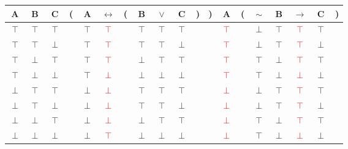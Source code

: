 \documentclass[11pt]{article}
\begin{document}
\vspace{2em}

\begin{tabular}{ c  c  c | c  c  c  c  c  c  c  c  c | c | c  c  c  c  c  c }
A & B & C & ( & A & $\leftrightarrow$ & ( & B & $\lor$ & C & ) & ) & A & ( & $\sim$ & B & $\rightarrow$ & C & )\\
\hline 
$\top$ & $\top$ & $\top$ &  & $\top$ & \textcolor{red}{$\top$} &  & $\top$ & $\top$ & $\top$ &  &  & \textcolor{red}{$\top$} &  & $\perp$ & $\top$ & \textcolor{red}{$\top$} & $\top$ & \\
$\top$ & $\top$ & $\perp$ &  & $\top$ & \textcolor{red}{$\top$} &  & $\top$ & $\top$ & $\perp$ &  &  & \textcolor{red}{$\top$} &  & $\perp$ & $\top$ & \textcolor{red}{$\top$} & $\perp$ & \\
$\top$ & $\perp$ & $\top$ &  & $\top$ & \textcolor{red}{$\top$} &  & $\perp$ & $\top$ & $\top$ &  &  & \textcolor{red}{$\top$} &  & $\top$ & $\perp$ & \textcolor{red}{$\top$} & $\top$ & \\
$\top$ & $\perp$ & $\perp$ &  & $\top$ & \textcolor{red}{$\perp$} &  & $\perp$ & $\perp$ & $\perp$ &  &  & \textcolor{red}{$\top$} &  & $\top$ & $\perp$ & \textcolor{red}{$\perp$} & $\perp$ & \\
$\perp$ & $\top$ & $\top$ &  & $\perp$ & \textcolor{red}{$\perp$} &  & $\top$ & $\top$ & $\top$ &  &  & \textcolor{red}{$\perp$} &  & $\perp$ & $\top$ & \textcolor{red}{$\top$} & $\top$ & \\
$\perp$ & $\top$ & $\perp$ &  & $\perp$ & \textcolor{red}{$\perp$} &  & $\top$ & $\top$ & $\perp$ &  &  & \textcolor{red}{$\perp$} &  & $\perp$ & $\top$ & \textcolor{red}{$\top$} & $\perp$ & \\
$\perp$ & $\perp$ & $\top$ &  & $\perp$ & \textcolor{red}{$\perp$} &  & $\perp$ & $\top$ & $\top$ &  &  & \textcolor{red}{$\perp$} &  & $\top$ & $\perp$ & \textcolor{red}{$\top$} & $\top$ & \\
$\perp$ & $\perp$ & $\perp$ &  & $\perp$ & \textcolor{red}{$\top$} &  & $\perp$ & $\perp$ & $\perp$ &  &  & \textcolor{red}{$\perp$} &  & $\top$ & $\perp$ & \textcolor{red}{$\perp$} & $\perp$ & \\
\end{tabular}




\end{document}
